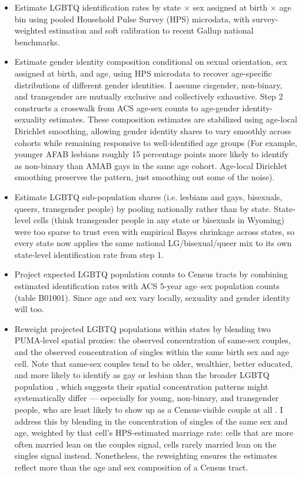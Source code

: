 \documentclass[11pt]{article}
\begin{document}
\begin{itemize}
\item Estimate LGBTQ identification rates by state $\times$ sex assigned at
  birth $\times$ age bin using pooled Household Pulse Survey (HPS) microdata,
  with survey-weighted estimation and soft calibration to recent Gallup
  national benchmarks.

\item Estimate gender identity composition conditional on sexual orientation,
  sex assigned at birth, and age, using HPS microdata to recover age-specific
  distributions of different gender identities. I assume cisgender,
  non-binary, and transgender are mutually exclusive and collectively
  exhaustive. Step 2 constructs a crosswalk from ACS age-sex counts to
  age-gender identity-sexuality estimates. These composition estimates are
  stabilized using age-local Dirichlet smoothing, allowing gender identity
  shares to vary smoothly across cohorts while remaining responsive to
  well-identified age groups (For example, younger AFAB lesbians roughly 15
  percentage points more likely to identify as non-binary than AMAB gays in
  the same age cohort. Age-local Dirichlet smoothing preserves the pattern,
  just smoothing out some of the noise).

\item Estimate LGBTQ sub-population shares (i.e. lesbians and gays, bisexuals,
  queers, transgender people) by pooling nationally rather than by state.
  State-level cells (think transgender people in any state or bisexuals in
  Wyoming) were too sparse to trust even with empirical Bayes shrinkage
  across states, so every state now applies the same national
  LG/bisexual/queer mix to its own state-level identification rate from
  step 1.

\item Project expected LGBTQ population counts to Census tracts by combining
  estimated identification rates with ACS 5-year age--sex population counts
  (table B01001). Since age and sex vary locally, sexuality and gender
  identity will too.

\item Reweight projected LGBTQ populations within states by blending two
  PUMA-level spatial proxies: the observed concentration of same-sex couples,
  and the observed concentration of singles within the same birth sex and
  age cell. Note that same-sex couples tend to be older, wealthier, better
  educated, and more likely to identify as gay or lesbian than the broader
  LGBTQ population \citep{julian2024a}, which suggests their spatial concentration patterns might
  systematically differ --- especially for young, non-binary, and transgender
  people, who are least likely to show up as a Census-visible couple at all \citep{gates2013}.
  I address this by blending in the concentration of singles of the same sex
  and age, weighted by that cell's HPS-estimated marriage rate: cells that
  are more often married lean on the couples signal, cells rarely married
  lean on the singles signal instead. Nonetheless, the reweighting ensures
  the estimates reflect more than the age and sex composition of a Census
  tract.


\end{itemize}
\end{document}
